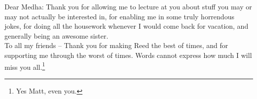 Dear Medha: Thank you for allowing me to lecture at you about stuff you may or may not actually be interested in, for enabling me in some truly horrendous jokes, for doing all the housework whenever I would come back for vacation, and generally being an awesome sister. \\

To all my friends -- Thank you for making Reed the best of times, and for supporting me through the worst of times. Words cannot express how much I will miss you all.\footnote{Yes Matt, even you.}




